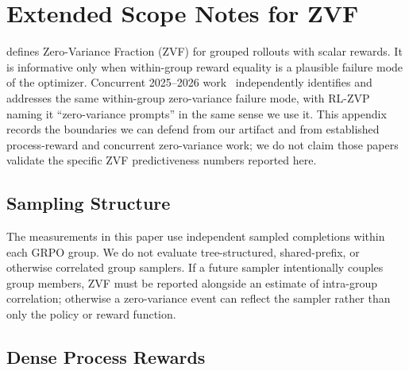 %

\section{Extended Scope Notes for ZVF}
\label{sec:extended-related-work}

\ours{} defines Zero-Variance Fraction (ZVF) for grouped rollouts with scalar
rewards. It is informative only when within-group reward equality is a plausible
failure mode of the optimizer. Concurrent 2025--2026
work~\cite{nan2025ngrpo,le2025rlzvp,zhang2025scaffgrpo,feng2025lens,pikus2025hardexamples,han2026ebpo}
independently identifies and addresses the same within-group zero-variance
failure mode, with RL-ZVP~\cite{le2025rlzvp} naming it ``zero-variance
prompts'' in the same sense we use it. This appendix records the boundaries
we can defend from our artifact and from established process-reward and
concurrent zero-variance work; we do not claim those papers validate the
specific ZVF predictiveness numbers reported here.

\subsection{Sampling Structure}
\label{sec:ext:tree-prm}

The measurements in this paper use independent sampled completions within each
GRPO group. We do not evaluate tree-structured, shared-prefix, or otherwise
correlated group samplers. If a future sampler intentionally couples group
members, ZVF must be reported alongside an estimate of intra-group correlation;
otherwise a zero-variance event can reflect the sampler rather than only the
policy or reward function.

\subsection{Dense Process Rewards}

